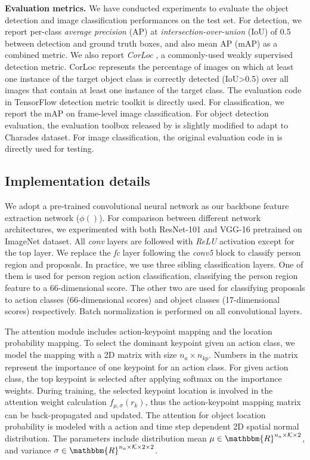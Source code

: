\textbf{Evaluation metrics.} We have conducted experiments to evaluate the object detection and image classification performances on the test set. For detection, we report per-class \textit{average precision} (AP) at \textit{intersection-over-union} (IoU) of 0.5 between detection and ground truth boxes, and also mean AP (mAP) as a combined metric. We also report \textit{CorLoc} \cite{deselaers2012weakly}, a commonly-used weakly supervised detection metric. CorLoc represents the percentage of images on which at least one instance of the target object class is correctly detected (IoU\textgreater0.5) over all images that contain at least one instance of the target class. The evaluation code in TensorFlow detection metric toolkit is directly used. For classification, we report the mAP on frame-level image classification. For object detection evaluation, the evaluation toolbox released by \cite{girshick2015fast} is slightly modified to adapt to Charades dataset. For image classification, the original evaluation code in \cite{pascal-voc-2012} is directly used for testing.

\subsection{Implementation details}
We adopt a pre-trained convolutional neural network as our backbone feature extraction network ($\phi()$). For comparison between different network architectures, we experimented with both ResNet-101 and VGG-16 pretrained on ImageNet dataset. All \textit{conv} layers are followed with \textit{ReLU} activation except for the top layer. We replace the \textit{fc} layer following the \textit{conv5} block to classify person region and proposals. In practice, we use three sibling classification layers. One of them is used for person region action classification, classifying the person region feature to a 66-dimensional score. The other two are used for classifying proposals to action classes (66-dimensional scores) and object classes (17-dimensional scores) respectively. Batch normalization \cite{ioffe2015batch} is performed on all convolutional layers. 

The attention module includes action-keypoint mapping and the location probability mapping. To select the dominant keypoint given an action class, we model the mapping with a 2D matrix with size $n_a\times n_{kp}$. Numbers in the matrix represent the importance of one keypoint for an action class. For given action class, the top keypoint is selected after applying softmax on the importance weights. During training, the selected keypoint location is involved in the attention weight calculation $f_{\mu, \sigma}(r_k)$, thus the action-keypoint mapping matrix can be back-propagated and updated. The attention for object location probability is modeled with a action and time step dependent 2D spatial normal distribution. The parameters include distribution mean $\mu \in \mathbbm{R}^{n_a\times\scr{K}\times2}$, and variance $\sigma \in \mathbbm{R}^{n_a\times\scr{K}\times2\times2}$.

